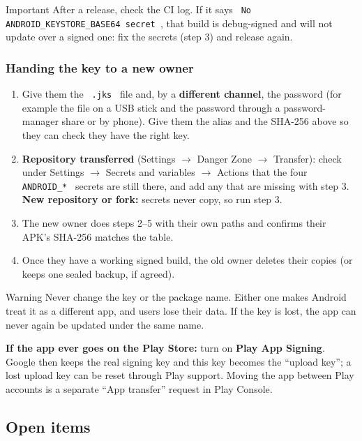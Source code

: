 \documentclass[12pt,a4paper]{article}
\newcommand{\codebs}{\symbol{92}\penalty50\relax}
\newcommand{\code}[1]{\texttt{\let\textbackslash\codebs\XeTeXinterchartokenstate=1 #1\XeTeXinterchartokenstate=0 }}
\newenvironment{important}{\begin{remark}{Important}}{\end{remark}}
\newenvironment{warning}{\begin{remark}{Warning}}{\end{remark}}
\begin{document}
\begin{important}
After a release, check the CI log. If it says \code{No ANDROID_KEYSTORE_BASE64 secret}, that build is debug-signed and will not update over a signed one: fix the secrets (step 3) and release again.
\end{important}

\subsubsection{Handing the key to a new owner}

\begin{enumerate}
\item Give them the \code{.jks} file and, by a \textbf{different channel}, the password (for example the file on a USB stick and the password through a password-manager share or by phone). Give them the alias and the SHA-256 above so they can check they have the right key.
\item \textbf{Repository transferred} (Settings $\rightarrow$ Danger Zone $\rightarrow$ Transfer): check under Settings $\rightarrow$ Secrets and variables $\rightarrow$ Actions that the four \code{ANDROID_*} secrets are still there, and add any that are missing with step 3. \textbf{New repository or fork:} secrets never copy, so run step 3.
\item The new owner does steps 2--5 with their own paths and confirms their APK's SHA-256 matches the table.
\item Once they have a working signed build, the old owner deletes their copies (or keeps one sealed backup, if agreed).
\end{enumerate}

\begin{warning}
Never change the key or the package name. Either one makes Android treat it as a different app, and users lose their data. If the key is lost, the app can never again be updated under the same name.
\end{warning}

\textbf{If the app ever goes on the Play Store:} turn on \textbf{Play App Signing}. Google then keeps the real signing key and this key becomes the ``upload key''; a lost upload key can be reset through Play support. Moving the app between Play accounts is a separate ``App transfer'' request in Play Console.

\subsection{Open items}\label{sec:open}
\end{document}
